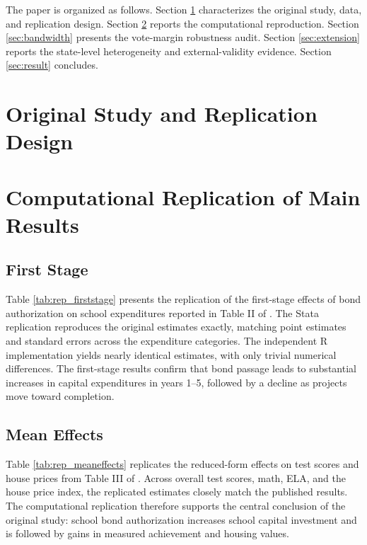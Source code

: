 \documentclass[12pt]{article}
\begin{document}
The paper is organized as follows. Section \ref{sec:data_rep} characterizes the original study, data, and replication design. Section \ref{sec:replication} reports the computational reproduction. Section \ref{sec:bandwidth} presents the vote-margin robustness audit. Section \ref{sec:extension} reports the state-level heterogeneity and external-validity evidence. Section \ref{sec:result} concludes.

\section{Original Study and Replication Design} \label{sec:data_rep}



\section{Computational Replication of Main Results} \label{sec:replication}

\subsection{First Stage}

Table \ref{tab:rep_firststage} presents the replication of the first-stage effects of bond authorization on school expenditures reported in Table II of \citet{biasi_what_2025}. The Stata replication reproduces the original estimates exactly, matching point estimates and standard errors across the expenditure categories. The independent R implementation yields nearly identical estimates, with only trivial numerical differences. The first-stage results confirm that bond passage leads to substantial increases in capital expenditures in years 1--5, followed by a decline as projects move toward completion.



\subsection{Mean Effects}

Table \ref{tab:rep_meaneffects} replicates the reduced-form effects on test scores and house prices from Table III of \citet{biasi_what_2025}. Across overall test scores, math, ELA, and the house price index, the replicated estimates closely match the published results. The computational replication therefore supports the central conclusion of the original study: school bond authorization increases school capital investment and is followed by gains in measured achievement and housing values.
\end{document}
